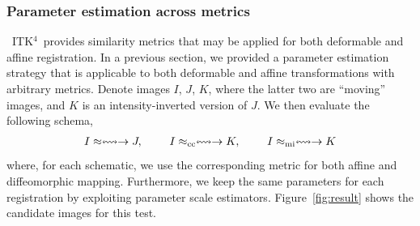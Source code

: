 \documentclass{frontiersSCNS}
\newcommand{\tk}{~ITK$^{\text{4}}$~}
\begin{document}
\subsubsection{Parameter estimation across metrics}
\tk provides similarity metrics that may be applied for both
deformable and affine registration.  In a previous section, we
provided a parameter estimation strategy that is applicable to both
deformable and affine transformations with arbitrary metrics.  Denote
images $I$, $J$, $K$, where the latter two are ``moving'' images, and
$K$ is an intensity-inverted version of $J$.
We then evaluate the following schema,
\begin{eqnarray}
I \approx \leftrightsquigarrow  \rightarrow J,~~~~~~~
I \approx_\text{cc} \leftrightsquigarrow  \rightarrow  K,~~~~~~~  
I \approx_\text{mi} \leftrightsquigarrow  \rightarrow  K   \notag 
\end{eqnarray}
where, for each schematic, we use the corresponding metric for both
affine and diffeomorphic mapping.  Furthermore, we keep the same
parameters for each registration by exploiting parameter scale
estimators.  Figure~\ref{fig:result} shows the candidate images for
this test. 
\end{document}
